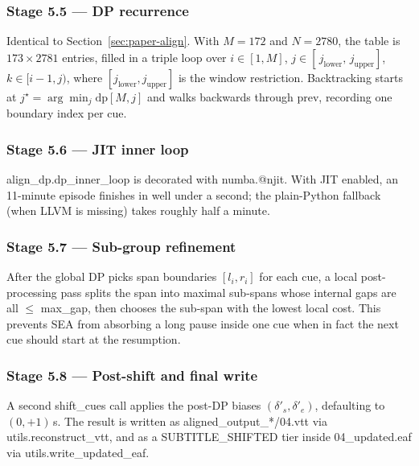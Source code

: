 \documentclass[11pt,a4paper]{article}
\def\texttt#1{#1}%
\begin{document}
\subsubsection{Stage 5.5 --- DP recurrence}
Identical to Section~\ref{sec:paper-align}. With $M=172$ and $N=2780$,
the table is $173 \times 2781$ entries, filled in a triple loop over
$i \in [1,M]$, $j \in [\,j_\text{lower},\,j_\text{upper}]$,
$k \in [i-1, j)$, where $[j_\text{lower}, j_\text{upper}]$ is the window
restriction. Backtracking starts at
$j^\star = \arg\min_j \mathrm{dp}[M, j]$ and walks backwards through
\texttt{prev}, recording one boundary index per cue.

\subsubsection{Stage 5.6 --- JIT inner loop}
\texttt{align\_dp.dp\_inner\_loop} is decorated with \texttt{numba.@njit}.
With JIT enabled, an 11-minute episode finishes in well under a second; the
plain-Python fallback (when LLVM is missing) takes roughly half a minute.

\subsubsection{Stage 5.7 --- Sub-group refinement}
After the global DP picks span boundaries $[l_i, r_i]$ for each cue, a local
post-processing pass splits the span into maximal sub-spans whose internal
gaps are all $\le$ \texttt{max\_gap}, then chooses the sub-span with the
lowest local cost. This prevents SEA from absorbing a long pause inside one
cue when in fact the next cue should start at the resumption.

\subsubsection{Stage 5.8 --- Post-shift and final write}
A second \texttt{shift\_cues} call applies the post-DP biases
$(\delta'_s, \delta'_e)$, defaulting to $(0, +1)$\,s. The result is written
as \texttt{aligned\_output\_*/04.vtt} via \texttt{utils.reconstruct\_vtt},
and as a \texttt{SUBTITLE\_SHIFTED} tier inside \texttt{04\_updated.eaf} via
\texttt{utils.write\_updated\_eaf}.
\end{document}
